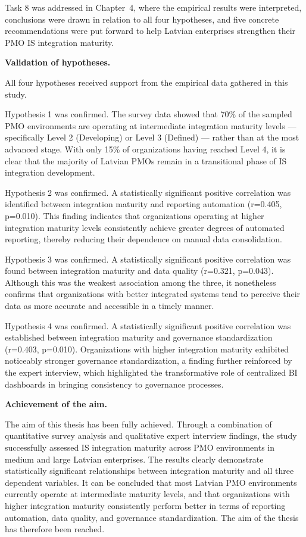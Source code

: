Task 8 was addressed in Chapter~4, where the empirical results
were interpreted, conclusions were drawn in relation to all four
hypotheses, and five concrete recommendations were put forward
to help Latvian enterprises strengthen their PMO IS integration
maturity.

\textbf{Validation of hypotheses.}

All four hypotheses received support from the empirical data
gathered in this study.

Hypothesis 1 was confirmed. The survey data showed that 70\%
of the sampled PMO environments are operating at intermediate
integration maturity levels — specifically Level 2 (Developing)
or Level 3 (Defined) — rather than at the most advanced stage.
With only 15\% of organizations having reached Level 4, it is
clear that the majority of Latvian PMOs remain in a transitional
phase of IS integration development.

Hypothesis 2 was confirmed. A statistically significant positive
correlation was identified between integration maturity and
reporting automation (r=0.405, p=0.010). This finding indicates
that organizations operating at higher integration maturity levels
consistently achieve greater degrees of automated reporting,
thereby reducing their dependence on manual data consolidation.

Hypothesis 3 was confirmed. A statistically significant positive
correlation was found between integration maturity and data
quality (r=0.321, p=0.043). Although this was the weakest
association among the three, it nonetheless confirms that
organizations with better integrated systems tend to perceive
their data as more accurate and accessible in a timely manner.

Hypothesis 4 was confirmed. A statistically significant positive
correlation was established between integration maturity and
governance standardization (r=0.403, p=0.010). Organizations
with higher integration maturity exhibited noticeably stronger
governance standardization, a finding further reinforced by the
expert interview, which highlighted the transformative role of
centralized BI dashboards in bringing consistency to governance
processes.

\textbf{Achievement of the aim.}

The aim of this thesis has been fully achieved. Through a
combination of quantitative survey analysis and qualitative
expert interview findings, the study successfully assessed IS
integration maturity across PMO environments in medium and large
Latvian enterprises. The results clearly demonstrate statistically
significant relationships between integration maturity and all
three dependent variables. It can be concluded that most Latvian
PMO environments currently operate at intermediate maturity levels,
and that organizations with higher integration maturity
consistently perform better in terms of reporting automation,
data quality, and governance standardization. The aim of the
thesis has therefore been reached.

